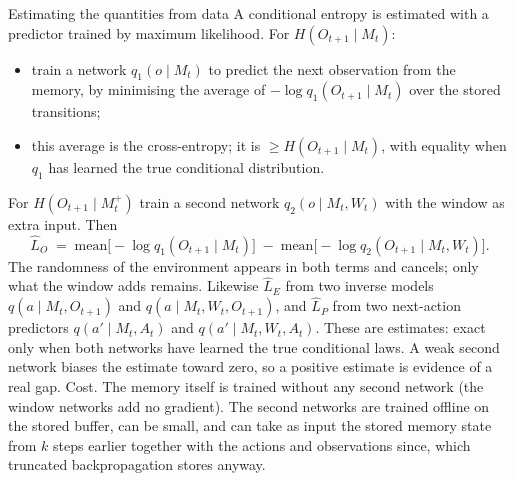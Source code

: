 \documentclass[11pt,aspectratio=169]{beamer}
\begin{document}
\begin{frame}[shrink=8]{Estimating the quantities from data}
A conditional entropy is estimated with a predictor trained by maximum likelihood. For $H(O_{t+1} \mid M_t)$:
\begin{itemize}
\item train a network $q_1(o \mid M_t)$ to predict the next observation from the memory, by minimising the average of $-\log q_1(O_{t+1} \mid M_t)$ over the stored transitions;
\item this average is the cross-entropy; it is $\ge H(O_{t+1} \mid M_t)$, with equality when $q_1$ has learned the true conditional distribution.
\end{itemize}
For $H(O_{t+1} \mid M^+_t)$ train a second network $q_2(o \mid M_t, W_t)$ with the window as extra input. Then
\[
\hat L_O \;=\; \text{mean}\big[-\log q_1(O_{t+1} \mid M_t)\big] \;-\; \text{mean}\big[-\log q_2(O_{t+1} \mid M_t, W_t)\big] .
\]
The randomness of the environment appears in both terms and cancels; only what the window adds remains.
\vspace{2mm}
Likewise $\hat L_E$ from two inverse models $q(a \mid M_t, O_{t+1})$ and $q(a \mid M_t, W_t, O_{t+1})$, and $\hat L_P$ from two next-action predictors $q(a' \mid M_t, A_t)$ and $q(a' \mid M_t, W_t, A_t)$.
\vspace{2mm}
These are estimates: exact only when both networks have learned the true conditional laws. A weak second network biases the estimate toward zero, so a positive estimate is evidence of a real gap.
\vspace{2mm}
Cost. The memory itself is trained without any second network (the window networks add no gradient). The second networks are trained offline on the stored buffer, can be small, and can take as input the stored memory state from $k$ steps earlier together with the actions and observations since, which truncated backpropagation stores anyway.
\end{frame}
\end{document}

